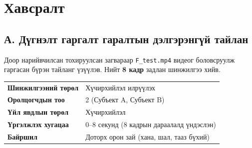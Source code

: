 
\chapter*{Хавсралт}
{}

\section*{А. Дүгнэлт гаргалт гаралтын дэлгэрэнгүй тайлан}
{}

Доор нарийвчилсан тохируулсан загвараар \texttt{F\_test.mp4} видеог боловсруулж гаргасан бүрэн
тайланг үзүүлэв. Нийт \textbf{8 кадр} задлан шинжилгээ хийв.

\vspace{6pt}

\begin{tcolorbox}[tab2, title={Ерөнхий мэдээлэл}]
\small
\begin{tabular}{@{}ll}
\textbf{Шинжилгээний төрөл}   & Хүчирхийлэл илрүүлэх \\
\textbf{Оролцогчдын тоо}       & 2 (Субъект A, Субъект B) \\
\textbf{Үйл явдлын төрөл}      & Хүчирхийлэл \\
\textbf{Үргэлжлэх хугацаа}    & 0--8 секунд (8 кадрын дараалалд үндэслэн) \\
\textbf{Байршил}               & Доторх орон зай (хана, шал, тааз бүхий) \\
\end{tabular}
\end{tcolorbox}

\vspace{4pt}

